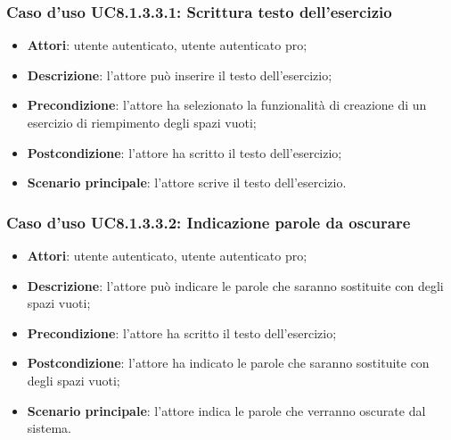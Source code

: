 \subsubsection{Caso d'uso UC8.1.3.3.1: Scrittura testo dell'esercizio}
	\begin{itemize}
		\item
			\textbf{Attori}: utente autenticato, utente autenticato pro;
		\item		
			\textbf{Descrizione}: l'attore può inserire il testo dell'esercizio;
		\item
			\textbf{Precondizione}: l'attore ha selezionato la funzionalità di creazione di un esercizio di riempimento degli spazi vuoti; 
		\item
			\textbf{Postcondizione}: l'attore ha scritto il testo dell'esercizio;
		\item
			\textbf{Scenario principale}: l'attore scrive il testo dell'esercizio.
	\end{itemize}


\subsubsection{Caso d'uso UC8.1.3.3.2: Indicazione parole da oscurare}
	\begin{itemize}
		\item
			\textbf{Attori}: utente autenticato, utente autenticato pro;
		\item		
			\textbf{Descrizione}: l'attore può indicare le parole che saranno sostituite con degli spazi vuoti;
		\item
			\textbf{Precondizione}: l'attore ha scritto il testo dell'esercizio; 
		\item
			\textbf{Postcondizione}: l'attore ha indicato le parole che saranno sostituite con degli spazi vuoti;
		\item
			\textbf{Scenario principale}: l'attore indica le parole che verranno oscurate dal sistema.
	\end{itemize}